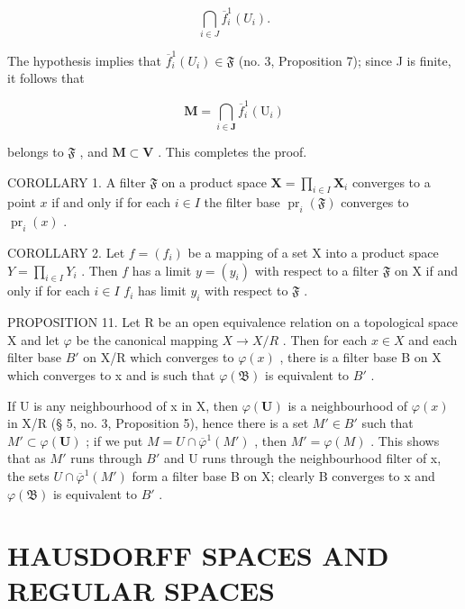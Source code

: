 \[
\bigcap_ {i \in J} \overline {{f}} _ {i} ^ {1} (U _ {i}).
\]

The hypothesis implies that \(\overline{f}_{i}^{1}(U_{i})\in\mathfrak{F}\) (no. 3, Proposition 7); since J is finite, it follows that

\[
\mathbf {M} = \bigcap_ {i \in \mathbf {J}} \overline {{f}} _ {i} ^ {1} (\mathrm{U} _ {i})
\]

belongs to \(\mathfrak{F}\) , and \(\mathbf{M} \subset \mathbf{V}\) . This completes the proof.

COROLLARY 1. A filter \(\mathfrak{F}\) on a product space \(\mathbf{X} = \prod_{i\in I}\mathbf{X}_i\) converges to a point \(x\) if and only if for each \(i\in I\) the filter base \(\operatorname{pr}_{i}(\mathfrak{F})\) converges to \(\operatorname{pr}_{i}(x)\) .

COROLLARY 2. Let \(f = (f_{i})\) be a mapping of a set X into a product space \(Y = \prod_{i \in I} Y_{i}\) . Then \(f\) has a limit \(y = (y_{i})\) with respect to a filter \(\mathfrak{F}\) on X if and only if for each \(i \in I\) \(f_{i}\) has limit \(y_{i}\) with respect to \(\mathfrak{F}\) .

PROPOSITION 11. Let R be an open equivalence relation on a topological space X and let \(\varphi\) be the canonical mapping \(X \rightarrow X/R\) . Then for each \(x \in X\) and each filter base \(B'\) on X/R which converges to \(\varphi(x)\) , there is a filter base B on X which converges to x and is such that \(\varphi(\mathfrak{B})\) is equivalent to \(B'\) .

If U is any neighbourhood of x in X, then \(\varphi(\mathbf{U})\) is a neighbourhood of \(\varphi(x)\) in X/R (§ 5, no. 3, Proposition 5), hence there is a set \(M' \in B'\) such that \(M' \subset \varphi(\mathbf{U})\) ; if we put \(M = U \cap \overline{\varphi}^{1}(M')\) , then \(M' = \varphi(M)\) . This shows that as \(M'\) runs through \(B'\) and U runs through the neighbourhood filter of x, the sets \(U \cap \overline{\varphi}^{1}(M')\) form a filter base B on X; clearly B converges to x and \(\varphi(\mathfrak{B})\) is equivalent to \(B'\) .

\section{HAUSDORFF SPACES AND REGULAR SPACES}
